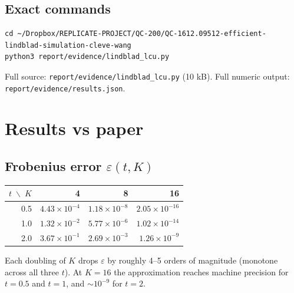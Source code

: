\documentclass[11pt]{article}
\begin{document}
\subsection{Exact commands}
\begin{verbatim}
cd ~/Dropbox/REPLICATE-PROJECT/QC-200/QC-1612.09512-efficient-lindblad-simulation-cleve-wang
python3 report/evidence/lindblad_lcu.py
\end{verbatim}
Full source: \texttt{report/evidence/lindblad\_lcu.py} (10 kB).\newline
Full numeric output: \texttt{report/evidence/results.json}.

\section{Results vs paper}
\label{sec:results}

\subsection{Frobenius error \texorpdfstring{$\varepsilon(t,K)$}{eps(t,K)}}
\begin{center}
\begin{tabular}{r|rrr}
\toprule
$t\;\backslash\;K$ & 4 & 8 & 16 \\
\midrule
0.5 & $4.43\!\times\!10^{-4}$ & $1.18\!\times\!10^{-8}$ & $2.05\!\times\!10^{-16}$ \\
1.0 & $1.32\!\times\!10^{-2}$ & $5.77\!\times\!10^{-6}$ & $1.02\!\times\!10^{-14}$ \\
2.0 & $3.67\!\times\!10^{-1}$ & $2.69\!\times\!10^{-3}$ & $1.26\!\times\!10^{-9}$ \\
\bottomrule
\end{tabular}
\end{center}

Each doubling of $K$ drops $\varepsilon$ by roughly 4–5 orders of magnitude
(monotone across all three $t$). At $K=16$ the approximation reaches machine
precision for $t=0.5$ and $t=1$, and $\sim\!10^{-9}$ for $t=2$.
\end{document}
